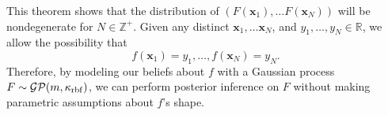 This theorem shows that the distribution of $(F(\mathbf{x}_1), \dots F(\mathbf{x}_N))$ will be nondegenerate for $N \in \mathbb{Z}^{+}$.
Given any distinct $\mathbf{x}_1, \dots \mathbf{x}_N$, and $y_1, \ldots, y_N \in \mathbb{R}$, we allow the possibility that
\begin{equation*}
    f(\mathbf{x}_1) = y_1, \dots, f(\mathbf{x}_N) = y_N.
\end{equation*}
Therefore, by modeling our beliefs about $f$ with a Gaussian process $F \sim \mathcal{GP}(m, \kappa_{\mathrm{rbf}})$,
we can perform posterior inference on $F$ without making parametric assumptions about $f$'s shape.

